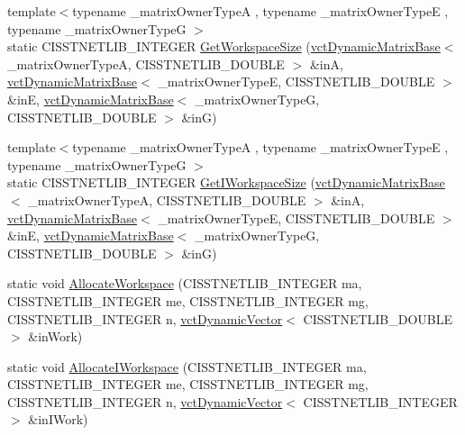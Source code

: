 \begin{DoxyCompactItemize}
\item 
{\footnotesize template$<$typename \-\_\-matrix\-Owner\-Type\-A , typename \-\_\-matrix\-Owner\-Type\-E , typename \-\_\-matrix\-Owner\-Type\-G $>$ }\\static C\-I\-S\-S\-T\-N\-E\-T\-L\-I\-B\-\_\-\-I\-N\-T\-E\-G\-E\-R \hyperlink{classnmr_l_sq_lin_solution_dynamic_a8cdae71d9dbcc8e12eada7da02a21f31}{Get\-Workspace\-Size} (\hyperlink{classvct_dynamic_matrix_base}{vct\-Dynamic\-Matrix\-Base}$<$ \-\_\-matrix\-Owner\-Type\-A, C\-I\-S\-S\-T\-N\-E\-T\-L\-I\-B\-\_\-\-D\-O\-U\-B\-L\-E $>$ \&in\-A, \hyperlink{classvct_dynamic_matrix_base}{vct\-Dynamic\-Matrix\-Base}$<$ \-\_\-matrix\-Owner\-Type\-E, C\-I\-S\-S\-T\-N\-E\-T\-L\-I\-B\-\_\-\-D\-O\-U\-B\-L\-E $>$ \&in\-E, \hyperlink{classvct_dynamic_matrix_base}{vct\-Dynamic\-Matrix\-Base}$<$ \-\_\-matrix\-Owner\-Type\-G, C\-I\-S\-S\-T\-N\-E\-T\-L\-I\-B\-\_\-\-D\-O\-U\-B\-L\-E $>$ \&in\-G)
\item 
{\footnotesize template$<$typename \-\_\-matrix\-Owner\-Type\-A , typename \-\_\-matrix\-Owner\-Type\-E , typename \-\_\-matrix\-Owner\-Type\-G $>$ }\\static C\-I\-S\-S\-T\-N\-E\-T\-L\-I\-B\-\_\-\-I\-N\-T\-E\-G\-E\-R \hyperlink{classnmr_l_sq_lin_solution_dynamic_aa5a262efd23844a2ac8d402fd250c0ee}{Get\-I\-Workspace\-Size} (\hyperlink{classvct_dynamic_matrix_base}{vct\-Dynamic\-Matrix\-Base}$<$ \-\_\-matrix\-Owner\-Type\-A, C\-I\-S\-S\-T\-N\-E\-T\-L\-I\-B\-\_\-\-D\-O\-U\-B\-L\-E $>$ \&in\-A, \hyperlink{classvct_dynamic_matrix_base}{vct\-Dynamic\-Matrix\-Base}$<$ \-\_\-matrix\-Owner\-Type\-E, C\-I\-S\-S\-T\-N\-E\-T\-L\-I\-B\-\_\-\-D\-O\-U\-B\-L\-E $>$ \&in\-E, \hyperlink{classvct_dynamic_matrix_base}{vct\-Dynamic\-Matrix\-Base}$<$ \-\_\-matrix\-Owner\-Type\-G, C\-I\-S\-S\-T\-N\-E\-T\-L\-I\-B\-\_\-\-D\-O\-U\-B\-L\-E $>$ \&in\-G)
\item 
static void \hyperlink{classnmr_l_sq_lin_solution_dynamic_acc868b744c8d40132279ecbf336c6587}{Allocate\-Workspace} (C\-I\-S\-S\-T\-N\-E\-T\-L\-I\-B\-\_\-\-I\-N\-T\-E\-G\-E\-R ma, C\-I\-S\-S\-T\-N\-E\-T\-L\-I\-B\-\_\-\-I\-N\-T\-E\-G\-E\-R me, C\-I\-S\-S\-T\-N\-E\-T\-L\-I\-B\-\_\-\-I\-N\-T\-E\-G\-E\-R mg, C\-I\-S\-S\-T\-N\-E\-T\-L\-I\-B\-\_\-\-I\-N\-T\-E\-G\-E\-R n, \hyperlink{classvct_dynamic_vector}{vct\-Dynamic\-Vector}$<$ C\-I\-S\-S\-T\-N\-E\-T\-L\-I\-B\-\_\-\-D\-O\-U\-B\-L\-E $>$ \&in\-Work)
\item 
static void \hyperlink{classnmr_l_sq_lin_solution_dynamic_a0fe27a44141dff5f06d220dc8ddf3c2d}{Allocate\-I\-Workspace} (C\-I\-S\-S\-T\-N\-E\-T\-L\-I\-B\-\_\-\-I\-N\-T\-E\-G\-E\-R ma, C\-I\-S\-S\-T\-N\-E\-T\-L\-I\-B\-\_\-\-I\-N\-T\-E\-G\-E\-R me, C\-I\-S\-S\-T\-N\-E\-T\-L\-I\-B\-\_\-\-I\-N\-T\-E\-G\-E\-R mg, C\-I\-S\-S\-T\-N\-E\-T\-L\-I\-B\-\_\-\-I\-N\-T\-E\-G\-E\-R n, \hyperlink{classvct_dynamic_vector}{vct\-Dynamic\-Vector}$<$ C\-I\-S\-S\-T\-N\-E\-T\-L\-I\-B\-\_\-\-I\-N\-T\-E\-G\-E\-R $>$ \&in\-I\-Work)

\end{DoxyCompactItemize}
